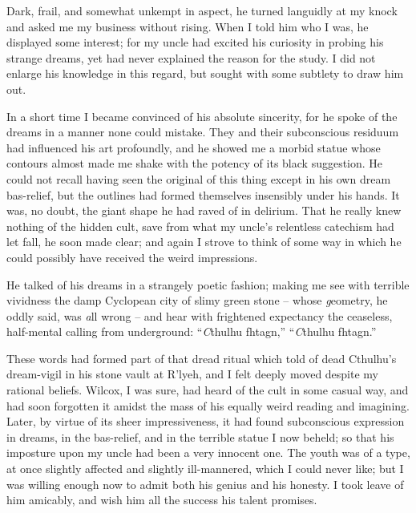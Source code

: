 Dark, frail, and somewhat unkempt in aspect, he turned languidly at my knock and asked me my business without rising. When I told him who I was, he displayed some interest; for my uncle had excited his curiosity in probing his strange dreams, yet had never explained the reason for the study. I did not enlarge his knowledge in this regard, but sought with some subtlety to draw him out.

In a short time I became convinced of his absolute sincerity, for he spoke of the dreams in a manner none could mistake. They and their subconscious residuum had influenced his art profoundly, and he showed me a morbid statue whose contours almost made me shake with the potency of its black suggestion. He could not recall having seen the original of this thing except in his own dream bas-relief, but the outlines had formed themselves insensibly under his hands. It was, no doubt, the giant shape he had raved of in delirium. That he really knew nothing of the hidden cult, save from what my uncle’s relentless catechism had let fall, he soon made clear; and again I strove to think of some way in which he could possibly have received the weird impressions.

He talked of his dreams in a strangely poetic fashion; making me see with terrible vividness the damp Cyclopean city of slimy green stone⁠ – whose {\emph geometry}, he oddly said, was {\emph all wrong}⁠ – and hear with frightened expectancy the ceaseless, half-mental calling from underground: “{\emph Cthulhu fhtagn},” “{\emph Cthulhu fhtagn.}”

These words had formed part of that dread ritual which told of dead Cthulhu’s dream-vigil in his stone vault at R’lyeh, and I felt deeply moved despite my rational beliefs. Wilcox, I was sure, had heard of the cult in some casual way, and had soon forgotten it amidst the mass of his equally weird reading and imagining. Later, by virtue of its sheer impressiveness, it had found subconscious expression in dreams, in the bas-relief, and in the terrible statue I now beheld; so that his imposture upon my uncle had been a very innocent one. The youth was of a type, at once slightly affected and slightly ill-mannered, which I could never like; but I was willing enough now to admit both his genius and his honesty. I took leave of him amicably, and wish him all the success his talent promises.

